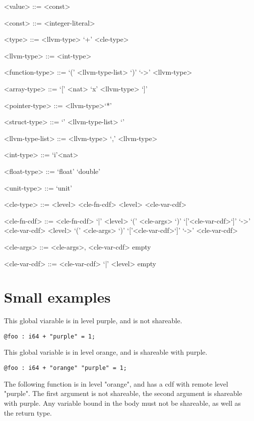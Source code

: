 \documentclass{article}
\begin{document}
\begin{grammar}
<value> ::= <const>

<const> ::= <integer-literal>

<type> ::= <llvm-type> `+' <cle-type>

<llvm-type> ::= <int-type>

<function-type> ::= `(' <llvm-type-list> `)' `->' <llvm-type>

<array-type> ::= `[' <nat> `x' <llvm-type> `]'

<pointer-type> ::= <llvm-type>`*'

<struct-type> ::= `{' <llvm-type-list> `}'

<llvm-type-list> ::= <llvm-type>
`,' <llvm-type>

<int-type> ::= `i'<nat>

<float-type> ::= `float' 
\alt `double'

<unit-type> ::= `unit'

<cle-type> ::= <level> <cle-fn-cdf> \alt <level> <cle-var-cdf> 

<cle-fn-cdf> ::= 
    <cle-fn-cdf> `|' <level> `(' <cle-args> `)' `['<cle-var-cdf>`]' `->' <cle-var-cdf>
    \alt <level> `(' <cle-args> `)' `['<cle-var-cdf>`]' `->' <cle-var-cdf>


<cle-args> ::= <cle-args>, <cle-var-cdf> \alt empty

<cle-var-cdf> ::=  <cle-var-cdf> `|' <level> \alt empty 

\end{grammar}

\section{Small examples}

This global viarable is in level purple, and is not shareable.
\begin{verbatim}
@foo : i64 + "purple" = 1;
\end{verbatim}


This global variable is in level orange, and is shareable with purple.
\begin{verbatim}
@foo : i64 + "orange" "purple" = 1;
\end{verbatim}


The following function is in level "orange", and has a cdf with remote level "purple".
The first argument is not shareable, 
the second argument is shareable with purple. 
Any variable bound in the body must not be shareable, as well as the return type.
\end{document}
